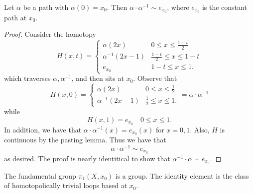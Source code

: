 \documentclass[a4paper,12pt,twoside]{hmcpset}
\begin{document}
\begin{problem}[Theorem 13.5]
    Let $\alpha$ be a path with $\alpha(0) = x_0$. Then $\alpha \cdot
    \alpha^{-1} \sim e_{x_0}$, where $e_{x_0}$ is the constant path at
    $x_0$. 
\end{problem}

\begin{proof}
    Consider the homotopy
    \[
        H(x, t) = 
        \begin{cases}
            \alpha(2x)  & 0 \le x \le \frac{1 - t}{2}\\
            \alpha^{-1}(2x - 1) & \frac{1-t}{2} \le x \le 1-t\\
            e_{x_0} & 1-t \le x \le 1.
        \end{cases}
    \]
    which traverses $\alpha, \alpha^{-1}$, and then sits at $x_0$.
    Observe that 
    \[
        H(x, 0) = 
        \begin{cases}
            \alpha(2x) & 0 \le x \le \frac{1}{2}\\
            \alpha^{-1}(2x - 1) & \frac{1}{2} \le x \le 1.
        \end{cases} = \alpha \cdot \alpha^{-1}
    \]
    while 
    \[
        H(x, 1) = e_{x_0} \quad 0 \le x \le 1.
    \]
    In addition, we have that $\alpha \cdot \alpha^{-1}(x) =
    e_{x_0}(x)$ for $x = 0, 1$. Also, $H$ is continuous by the pasting
    lemma. Thus we have that 
    \[
        \alpha \cdot \alpha^{-1} \sim e_{x_0}
    \] 
    as desired. The proof is nearly identitical to show that $\alpha^{-1}
    \cdot \alpha \sim e_{x_0}$.

\end{proof}

\begin{problem}[Theorem 13.6]
    The fundamental group $\pi_1(X, x_0)$ is a group. The identity
    element is the class of homotopolically trivial loops based at $x_0$.
\end{problem}
\end{document}
